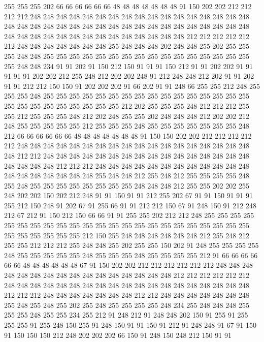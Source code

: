 255 255 255 202 66 66 66 66 66 66 48 48 48 48 48 48 48 91 150 202
202 212 212 212 212 248 248 248 248 248 248 248 248 248 248 248 248 248 248 248
248 248 248 248 248 248 248 248 248 248 248 248 248 248 248 248 248 248 248 248
248 248 248 248 248 248 248 248 248 248 248 248 248 248 248 212 212 212 212 212
212 248 248 248 248 248 248 248 255 248 248 248 202 248 248 255 202 255 255 255
248 248 255 255 255 255 255 255 255 255 255 255 255 255 255 255 255 255 255 248
248 234 91 91 202 91 150 212 150 91 91 91 150 212 91 91 202 202 91 91
91 91 91 202 202 212 255 248 212 202 202 248 91 212 248 248 212 202 91 91
202 91 91 212 212 150 150 91 202 202 202 91 66 202 91 91 248 66 255 255
212 248 255 255 255 248 255 255 255 255 255 255 255 255 255 255 255 255 255 255
255 255 255 255 255 255 255 255 255 255 255 212 202 255 255 255 248 212 212 212
255 255 212 255 255 255 248 212 202 248 255 255 202 248 248 248 212 202 202 212
248 255 255 255 255 255 212 255 255 255 248 255 255 255 255 255 255 255 248 212
66 66 66 66 66 66 48 48 48 48 48 48 48 91 150 150 202 202 212 212
212 212 212 248 248 248 248 248 248 248 248 248 248 248 248 248 248 248 248 248
248 248 212 212 248 248 248 248 248 248 248 248 248 248 248 248 248 248 248 248
248 248 248 248 212 212 212 248 248 248 248 248 248 248 248 248 248 248 248 248
248 248 248 248 248 248 255 248 248 212 255 248 212 255 255 255 255 248 255 248
255 255 255 255 255 255 255 255 248 248 248 212 255 255 202 202 255 248 202 202
150 202 212 248 91 91 150 91 91 212 255 202 67 91 91 150 91 91 91 255
212 150 248 91 202 67 91 255 66 91 91 212 212 150 67 91 248 150 91 212
248 212 67 212 91 150 212 150 66 66 91 91 255 255 202 212 212 248 255 255
255 255 255 255 255 255 255 255 255 255 255 255 255 255 255 255 255 255 255 255
255 255 255 255 255 255 255 212 150 255 248 248 248 248 248 248 212 255 248 212
255 255 212 212 212 255 248 248 255 202 255 255 150 202 91 248 255 255 255 255
248 255 255 255 255 255 248 255 255 255 248 255 255 255 255 212 91 66 66 66
66 66 66 48 48 48 48 48 48 67 91 150 202 202 212 212 212 212 212 212
248 248 248 248 248 248 248 248 248 248 248 248 248 248 248 248 212 212 212 212
212 212 248 248 248 248 248 248 248 248 248 248 248 248 248 248 248 248 248 248
248 212 212 212 248 248 248 248 248 248 248 212 212 248 248 248 248 248 248 248
255 248 255 248 255 202 255 248 255 255 255 255 248 234 255 248 248 248 255 255
255 248 255 255 234 255 212 91 248 212 91 248 248 202 150 91 255 91 255 255
255 91 255 248 150 255 91 248 150 91 91 150 91 212 91 248 248 91 67 91
150 91 150 150 150 212 248 202 202 202 66 150 91 248 150 248 212 150 91 91
